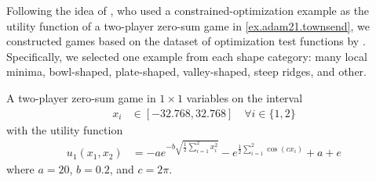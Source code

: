Following the idea of \textcite{adam.horčík.ea:double}, who used a constrained-optimization example as the utility function of a two-player zero-sum game in \cref{ex.adam21.townsend}, we constructed games based on the dataset of optimization test functions by \textcite{surjanovic13}. Specifically, we selected one example from each shape category: many local minima, bowl-shaped, plate-shaped, valley-shaped, steep ridges, and other.

\noindent
\begin{minipage}[c]{0.6\textwidth}
\begin{game}\label{ex.surjanovic.ackley}
A two-player zero-sum game in $1 \times 1$ variables on the interval
\begin{align*}
    x_i &\in [-32.768,32.768] \quad \forall i \in \{1,2\}
\end{align*}
with the utility function \cite[Ackley]{surjanovic13}
\begin{align*}
u_{1}(x_{1}, x_{2}) &=-a e^{-b \sqrt{\frac{1}{2}\sum_{i=1}^2 x_i^2}} - e^{\frac{1}{2}\sum_{i=1}^2\cos(cx_i)} + a + e
\end{align*}
where $a=20$, $b=0.2$, and $c=2\pi$.
\end{game}
\strut
\end{minipage}
\hfill
\begin{minipage}[c]{0.35\textwidth}
\end{minipage}




